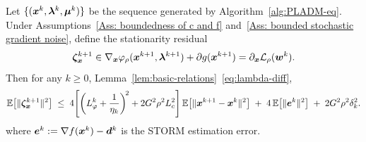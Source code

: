 \documentclass[10pt]{article}
\begin{document}
\begin{lemma}
\label{lem:stationarity}
Let $\{(\bm{x}^k, \bm{\lambda}^k, \bm{\mu}^k)\}$ be the sequence generated by
Algorithm~\ref{alg:PLADM-eq}.
Under Assumptions~\ref{Ass: boundedness of c and f}
and~\ref{Ass: bounded stochastic gradient noise},
define the stationarity residual
\begin{equation}
    \bm{\zeta}_{\bm{x}}^{k+1} \in \nabla_{\bm{x}}\varphi_\rho(\bm{x}^{k+1}, \bm{\lambda}^{k+1}) 
    + \partial g(\bm{x}^{k+1}) = \partial_{\bm{x}} \mathcal{L}_{\rho}(\bm{w}^k).
\end{equation}Then for any $k \geq 0$,
Lemma~\ref{lem:basic-relations}~\eqref{eq:lambda-diff},
\begin{equation}\label{eq:zeta-expect}
    \mathbb{E}\!\left[\|\bm{\zeta}_{\bm{x}}^{k+1}\|^2\right]
    \;\leq\;
    4\!\left[\left(L_\varphi^k+\frac{1}{\eta_k}\right)^{\!2}
             + 2G^2\rho^2 L_c^2\right]
    \mathbb{E}\!\left[\|\bm{x}^{k+1}-\bm{x}^k\|^2\right]
    \;+\; 4\,\mathbb{E}\!\left[\|\bm{e}^k\|^2\right]
    \;+\; 2G^2\rho^2\delta_k^2.
\end{equation} where $\bm{e}^k := \nabla f(\bm{x}^k) - \bm{d}^k$ is the STORM estimation error.
\end{lemma}


 
 
\end{document}
